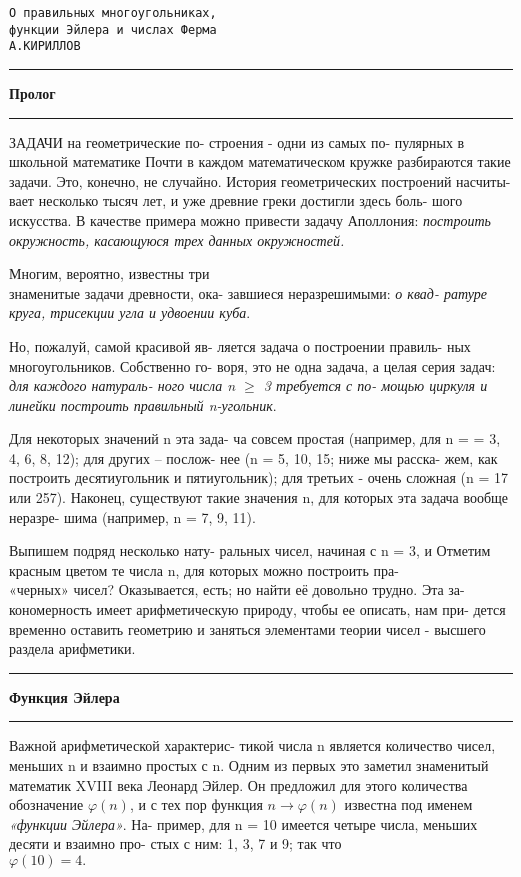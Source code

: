 \centering
\texttt{{\Huge О правильных многоугольниках,  \\ функции Эйлера и числах Ферма}}
\\
\texttt{{\large А.КИРИЛЛОВ}}

\begin{multicols}{3}

\noindent\rule{0.33\textwidth}{0.4pt}
\textbf{\large{Пролог}}
\noindent\rule{0.33\textwidth}{0.4pt}

\justifying
\lettrine[lines=3,nindent=2pt]{З}{}АДАЧИ на геометрические по-
строения - одни из самых по-
пулярных в школьной математике
Почти в каждом математическом
кружке разбираются такие задачи.
Это, конечно, не случайно. История
геометрических построений насчиты-
вает несколько тысяч лет, и уже
древние греки достигли здесь боль-
шого искусства. В качестве примера
можно привести задачу Аполлония:
\textit{построить окружность,  касающуюся трех данных окружностей.}

Многим,  вероятно,  известны три \\
знаменитые задачи древности,  ока-
завшиеся неразрешимыми: \textit{о квад-
ратуре круга, трисекции угла и
удвоении куба}.

Но, пожалуй, самой красивой яв-
ляется задача о построении правиль-
ных многоугольников. Собственно го-
воря, это не одна задача, а целая
серия задач: \textit{для каждого натураль-
ного числа n $\geq$ 3 требуется с по-
мощью циркуля и линейки построить правильный n-угольник}.

Для некоторых значений n эта зада-
ча совсем простая (например, для n =
= 3, 4, 6, 8, 12); для других – послож-
нее (n = 5, 10, 15; ниже мы расска-
жем, как построить десятиугольник и
пятиугольник); для третьих - очень
сложная (n = 17 или 257).  Наконец,
существуют такие значения n, для
которых эта задача вообще неразре-
шима (например, n = 7, 9, 11).

Выпишем подряд несколько нату-
ральных чисел, начиная с n = 3, и
Отметим красным цветом те числа n,
для которых можно построить пра-
\columnbreak
\\
«черных» чисел? Оказывается, есть;
но найти её довольно трудно. Эта за-
кономерность имеет арифметическую
природу, чтобы ее описать, нам при-
дется временно оставить геометрию и
заняться элементами теории чисел -
высшего раздела арифметики.

\noindent\rule{0.33\textwidth}{0.4pt}
\textbf{\large{Функция Эйлера}}

\noindent\rule{0.33\textwidth}{0.4pt}
Важной арифметической характерис-
тикой числа n является количество 
чисел, меньших n и взаимно простых
с n.  Одним из первых это заметил 
знаменитый математик XVIII века
Леонард Эйлер. Он предложил для
этого количества обозначение $\varphi(n)$, и
с тех пор функция $n \to \varphi(n)$ известна
под именем \textit{«функции Эйлера»}. На-
пример, для n = 10 имеется четыре 
числа,  меньших десяти и взаимно про-
стых с ним: 1, 3, 7 и 9; так что \\
$\varphi(10) = 4.$


\end{multicols}

